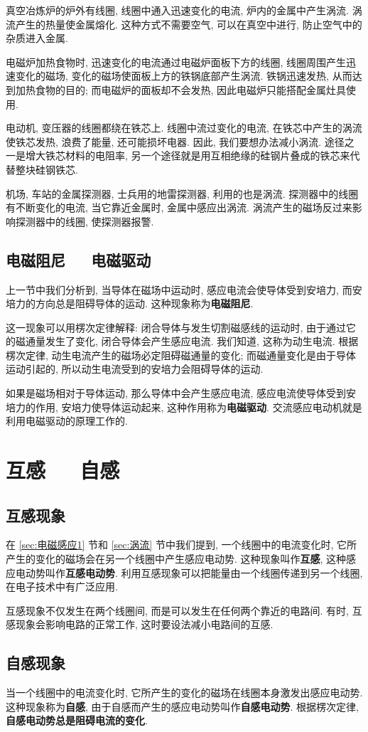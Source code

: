 \documentclass[UTF8,openany,fontset=fandol]{ctexbook}
\theoremstyle{chinesetextbook}
\newcommand{\bre}{\ \ \ }
\begin{document}
真空冶炼炉的炉外有线圈, 线圈中通入迅速变化的电流, 炉内的金属中产生涡流. 涡流产生的热量使金属熔化. 这种方式不需要空气, 可以在真空中进行, 防止空气中的杂质进入金属.

电磁炉加热食物时, 迅速变化的电流通过电磁炉面板下方的线圈, 线圈周围产生迅速变化的磁场, 变化的磁场使面板上方的铁锅底部产生涡流. 铁锅迅速发热, 从而达到加热食物的目的; 而电磁炉的面板却不会发热, 因此电磁炉只能搭配金属灶具使用.

电动机, 变压器的线圈都绕在铁芯上. 线圈中流过变化的电流, 在铁芯中产生的涡流使铁芯发热, 浪费了能量, 还可能损坏电器. 因此, 我们要想办法减小涡流. 途径之一是增大铁芯材料的电阻率, 另一个途径就是用互相绝缘的硅钢片叠成的铁芯来代替整块硅钢铁芯.

机场, 车站的金属探测器, 士兵用的地雷探测器, 利用的也是涡流. 探测器中的线圈有不断变化的电流, 当它靠近金属时, 金属中感应出涡流. 涡流产生的磁场反过来影响探测器中的线圈, 使探测器报警.
\subsection{电磁阻尼\bre 电磁驱动}
上一节中我们分析到, 当导体在磁场中运动时, 感应电流会使导体受到安培力, 而安培力的方向总是阻碍导体的运动. 这种现象称为\textbf{电磁阻尼}.

这一现象可以用楞次定律解释: 闭合导体与发生切割磁感线的运动时, 由于通过它的磁通量发生了变化, 闭合导体会产生感应电流. 我们知道, 这称为动生电流. 根据楞次定律, 动生电流产生的磁场必定阻碍磁通量的变化; 而磁通量变化是由于导体运动引起的, 所以动生电流受到的安培力会阻碍导体的运动.

如果是磁场相对于导体运动, 那么导体中会产生感应电流, 感应电流使导体受到安培力的作用, 安培力使导体运动起来, 这种作用称为\textbf{电磁驱动}. 交流感应电动机就是利用电磁驱动的原理工作的.
\section{互感\bre 自感}
\subsection{互感现象}
在 \ref{sec:电磁感应1} 节和 \ref{sec:涡流} 节中我们提到, 一个线圈中的电流变化时, 它所产生的变化的磁场会在另一个线圈中产生感应电动势. 这种现象叫作\textbf{互感}, 这种感应电动势叫作\textbf{互感电动势}. 利用互感现象可以把能量由一个线圈传递到另一个线圈, 在电子技术中有广泛应用.

互感现象不仅发生在两个线圈间, 而是可以发生在任何两个靠近的电路间. 有时, 互感现象会影响电路的正常工作, 这时要设法减小电路间的互感.
\subsection{自感现象}
当一个线圈中的电流变化时, 它所产生的变化的磁场在线圈本身激发出感应电动势. 这种现象称为\textbf{自感}, 由于自感而产生的感应电动势叫作\textbf{自感电动势}. 根据楞次定律, \textbf{自感电动势总是阻碍电流的变化}.
\end{document}
